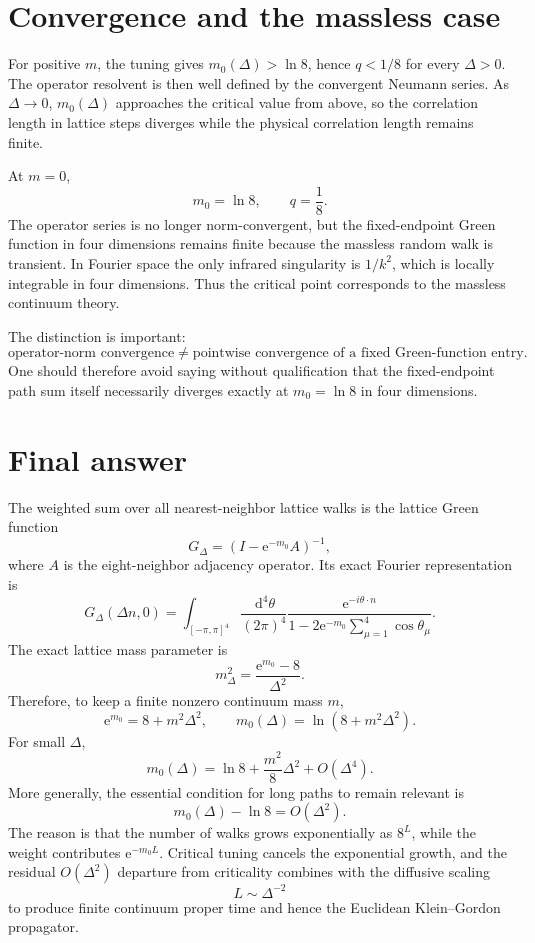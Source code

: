 \documentclass[11pt]{article}
\newcommand{\e}{\mathrm e}
\newcommand{\dd}{\,\mathrm d}
\begin{document}
	\section{Convergence and the massless case}
	For positive $m$, the tuning gives $m_0(\Delta)>\ln8$, hence $q<1/8$ for every $\Delta>0$. The operator resolvent is then well defined by the convergent Neumann series. As $\Delta\to0$, $m_0(\Delta)$ approaches the critical value from above, so the correlation length in lattice steps diverges while the physical correlation length remains finite.
	
	At $m=0$,
	\[
	m_0=\ln8,\qquad q=\frac18.
	\]
	The operator series is no longer norm-convergent, but the fixed-endpoint Green function in four dimensions remains finite because the massless random walk is transient. In Fourier space the only infrared singularity is $1/k^2$, which is locally integrable in four dimensions. Thus the critical point corresponds to the massless continuum theory.
	
	The distinction is important:
	\[
	\text{operator-norm convergence}\neq\text{pointwise convergence of a fixed Green-function entry}.
	\]
	One should therefore avoid saying without qualification that the fixed-endpoint path sum itself necessarily diverges exactly at $m_0=\ln8$ in four dimensions.
	
	\section{Final answer}
	The weighted sum over all nearest-neighbor lattice walks is the lattice Green function
	\[
	G_\Delta=(I-\e^{-m_0}A)^{-1},
	\]
	where $A$ is the eight-neighbor adjacency operator. Its exact Fourier representation is
	\[
	\boxed{
		G_\Delta(\Delta n,0)
		=\int_{[-\pi,\pi]^4}\frac{\dd^4\theta}{(2\pi)^4}
		\frac{\e^{-i\theta\cdot n}}
		{1-2\e^{-m_0}\sum_{\mu=1}^4\cos\theta_\mu}.
	}
	\]
	The exact lattice mass parameter is
	\[
	\boxed{
		m_\Delta^2=\frac{\e^{m_0}-8}{\Delta^2}.}
	\]
	Therefore, to keep a finite nonzero continuum mass $m$,
	\[
	\boxed{
		\e^{m_0}=8+m^2\Delta^2,
		\qquad
		m_0(\Delta)=\ln(8+m^2\Delta^2).
	}
	\]
	For small $\Delta$,
	\[
	\boxed{
		m_0(\Delta)
		=\ln8+\frac{m^2}{8}\Delta^2+O(\Delta^4).}
	\]
	More generally, the essential condition for long paths to remain relevant is
	\[
	\boxed{m_0(\Delta)-\ln8=O(\Delta^2).}
	\]
	The reason is that the number of walks grows exponentially as $8^L$, while the weight contributes $\e^{-m_0L}$. Critical tuning cancels the exponential growth, and the residual $O(\Delta^2)$ departure from criticality combines with the diffusive scaling
	\[
	\boxed{L\sim\Delta^{-2}}
	\]
	to produce finite continuum proper time and hence the Euclidean Klein--Gordon propagator.
	
\end{document}
